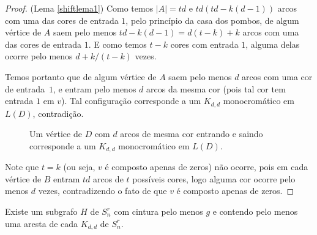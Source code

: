 \begin{proof}{(Lema \ref{shiftlema1})}
Como temos $|A| = td$ e $td(td - k(d-1))$ arcos com uma das cores de entrada $1$, pelo princípio da casa dos pombos, de algum vértice de $A$ saem pelo menos $td - k(d-1) = d(t-k) + k$ arcos com uma das cores de entrada $1$. E como temos $t-k$ cores com entrada $1$, alguma delas ocorre pelo menos $d + k/(t-k)$ vezes.

Temos portanto que de algum vértice de $A$ saem pelo menos $d$ arcos com uma cor de entrada~$1$, e entram pelo menos $d$ arcos da mesma cor (pois tal cor tem entrada $1$ em $v$). Tal configuração corresponde a um $K_{d,d}$ monocromático em $L(D)$, contradição.

\begin{figure}[H]
\centering
{}
\caption{Um vértice de $D$ com $d$ arcos de mesma cor entrando e saindo corresponde a um $K_{d,d}$ monocromático em $L(D)$.}
\label{fig:shiftkdd}
\end{figure}

Note que $t=k$ (ou seja, $v$ é composto apenas de zeros) não ocorre, pois em cada vértice de $B$ entram $td$ arcos de $t$ possíveis cores, logo alguma cor ocorre pelo menos $d$ vezes, contradizendo o fato de que $v$ é composto apenas de zeros.
\end{proof}

\begin{lema}\label{shiftlema2}
Existe um subgrafo $H$ de $S_n^r$ com cintura pelo menos $g$ e contendo pelo menos uma aresta de cada $K_{d,d}$ de $S_n^r$.
\end{lema}

